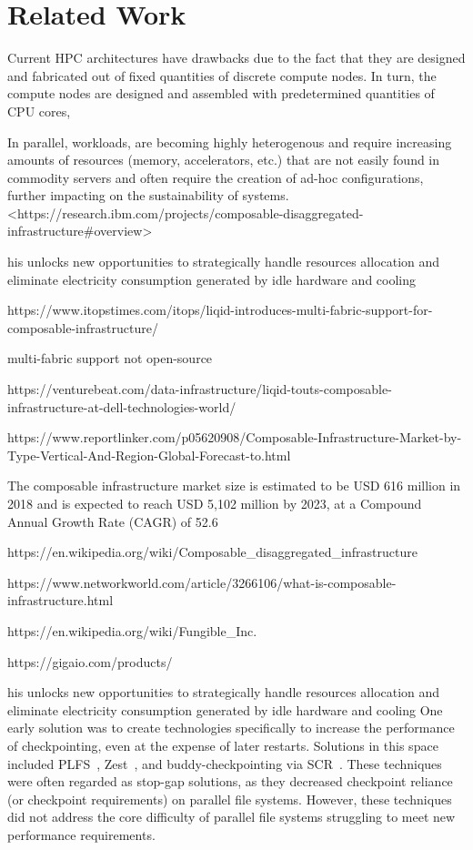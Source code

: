 \section{Related Work}
Current HPC architectures have drawbacks due to the fact that they are designed and fabricated out of fixed quantities of discrete compute nodes.  In turn, the compute nodes are designed and assembled with predetermined quantities of CPU cores,  


In parallel, workloads, are becoming highly heterogenous and require increasing amounts of resources (memory, accelerators, etc.) that are not easily found in commodity servers and often require the creation of ad-hoc configurations, further impacting on the sustainability of systems. <https://research.ibm.com/projects/composable-disaggregated-infrastructure#overview>

his unlocks new opportunities to strategically handle resources allocation and eliminate electricity consumption generated by idle hardware and cooling

https://www.itopstimes.com/itops/liqid-introduces-multi-fabric-support-for-composable-infrastructure/

multi-fabric support not open-source

https://venturebeat.com/data-infrastructure/liqid-touts-composable-infrastructure-at-dell-technologies-world/

https://www.reportlinker.com/p05620908/Composable-Infrastructure-Market-by-Type-Vertical-And-Region-Global-Forecast-to.html

The composable infrastructure market size is estimated to be USD 616 million in 2018 and is expected to reach USD 5,102 million by 2023, at a Compound Annual Growth Rate (CAGR) of 52.6%

https://en.wikipedia.org/wiki/Composable_disaggregated_infrastructure

https://www.networkworld.com/article/3266106/what-is-composable-infrastructure.html

https://en.wikipedia.org/wiki/Fungible_Inc.

https://gigaio.com/products/





his unlocks new opportunities to strategically handle resources allocation and eliminate electricity consumption generated by idle hardware and cooling
One early solution was to create technologies specifically to increase the performance of checkpointing, even at the expense of later restarts. Solutions in this space included PLFS~\cite{plfs}, Zest~\cite{zest}, and buddy-checkpointing via SCR~\cite{scr}. These techniques were often regarded as stop-gap solutions, as they decreased checkpoint reliance (or checkpoint requirements) on parallel file systems. However, these techniques did not address the core difficulty of parallel file systems struggling to meet new performance requirements.

